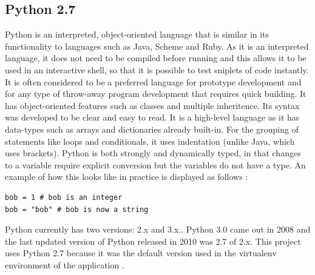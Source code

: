 \subsection{Python 2.7}
Python is an interpreted, object-oriented language that is similar in its functionality to languages such as Java, Scheme and Ruby. As it is an interpreted language, it does not need to be compiled before running and this allows it to be used in an interactive shell, so that it is possible to test sniplets of code instantly. It is often considered to be a preferred language for prototype development and for any type of throw-away program development that requires quick building. It has object-oriented features such as classes and multiple inheritence. Its syntax was developed to be clear and easy to read. It is a high-level language as it has data-types such as arrays and dictionaries already built-in. For the grouping of statements like loops and conditionals, it uses indentation (unlike Java, which uses brackets). Python is both strongly and dynamically typed, in that changes to a variable require explicit conversion but the variables do not have a type. An example of how this looks like in practice is displayed as follows \cite{pythonexample}:
\begin{verbatim}
bob = 1 # bob is an integer
bob = "bob" # bob is now a string
\end{verbatim}
Python currently has two versions: 2.x and 3.x.. Python 3.0 came out in 2008 and the last updated version of Python released in 2010 was 2.7 of 2.x.  This project uses Python 2.7 because it was the default version used in the virtualenv environment of the application \cite{python27}.


